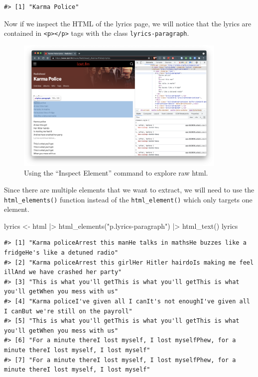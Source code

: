 \documentclass[
  letterpaper,
]{latex/krantz}
\newenvironment{Shaded}{\begin{snugshade}}{\end{snugshade}}
\newcommand{\FunctionTok}[1]{\textcolor[rgb]{0.28,0.35,0.67}{#1}}
\newcommand{\NormalTok}[1]{\textcolor[rgb]{0.00,0.23,0.31}{#1}}
\newcommand{\OtherTok}[1]{\textcolor[rgb]{0.00,0.23,0.31}{#1}}
\newcommand{\SpecialCharTok}[1]{\textcolor[rgb]{0.37,0.37,0.37}{#1}}
\newcommand{\StringTok}[1]{\textcolor[rgb]{0.13,0.47,0.30}{#1}}
\begin{document}
\begin{verbatim}
#> [1] "Karma Police"
\end{verbatim}

Now if we inspect the HTML of the lyrics page, we will notice that the
lyrics are contained in
\texttt{\textless{}p\textgreater{}\textless{}/p\textgreater{}} tags with
the class \texttt{lyrics-paragraph}.

\begin{figure}[h]

{\centering \includegraphics[width=0.9\textwidth,height=\textheight]{./figures/acquire-data/ad-lastfm-lyrics-inspect.png}

}

\caption{\label{fig-ad-inspect-element-lyrics-lastfm}Using the ``Inspect
Element'' command to explore raw html.}

\end{figure}

Since there are multiple elements that we want to extract, we will need
to use the \texttt{html\_elements()} function instead of the
\texttt{html\_element()} which only targets one element.

\begin{Shaded}
\begin{Highlighting}[]
\NormalTok{lyrics }\OtherTok{\textless{}{-}} 
\NormalTok{  html }\SpecialCharTok{|\textgreater{}} 
  \FunctionTok{html\_elements}\NormalTok{(}\StringTok{"p.lyrics{-}paragraph"}\NormalTok{) }\SpecialCharTok{|\textgreater{}} 
  \FunctionTok{html\_text}\NormalTok{()}
\NormalTok{lyrics}
\end{Highlighting}
\end{Shaded}

\begin{verbatim}
#> [1] "Karma policeArrest this manHe talks in mathsHe buzzes like a fridgeHe's like a detuned radio"      
#> [2] "Karma policeArrest this girlHer Hitler hairdoIs making me feel illAnd we have crashed her party"   
#> [3] "This is what you'll getThis is what you'll getThis is what you'll getWhen you mess with us"        
#> [4] "Karma policeI've given all I canIt's not enoughI've given all I canBut we're still on the payroll" 
#> [5] "This is what you'll getThis is what you'll getThis is what you'll getWhen you mess with us"        
#> [6] "For a minute thereI lost myself, I lost myselfPhew, for a minute thereI lost myself, I lost myself"
#> [7] "For a minute thereI lost myself, I lost myselfPhew, for a minute thereI lost myself, I lost myself"
\end{verbatim}
\end{document}
